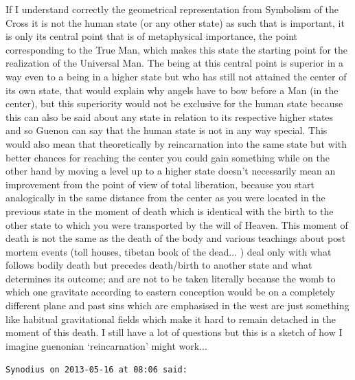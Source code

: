 \begin{footnotesize}
\begin{sffamily}
If I understand correctly the geometrical representation from Symbolism of the Cross it is not the human state (or any other state) as such that is important, it is only its central point that is of metaphysical importance, the point corresponding to the True Man, which makes this state the starting point for the realization of the Universal Man. The being at this central point is superior in a way even to a being in a higher state but who has still not attained the center of its own state, that would explain why angels have to bow before a Man (in the center), but this superiority would not be exclusive for the human state because this can also be said about any state in relation to its respective higher states and so Guenon can say that the human state is not in any way special. This would also mean that theoretically by reincarnation into the same state but with better chances for reaching the center you could gain something while on the other hand by moving a level up to a higher state doesn't necessarily mean an improvement from the point of view of total liberation, because you start analogically in the same distance from the center as you were located in the previous state in the moment of death which is identical with the birth to the other state to which you were transported by the will of Heaven. This moment of death is not the same as the death of the body and various teachings about post mortem events (toll houses, tibetan book of the dead... ) deal only with what follows bodily death but precedes death/birth to another state and what determines its outcome; and are not to be taken literally because the womb to which one gravitate according to eastern conception would be on a completely different plane and past sins which are emphasised in the west are just something like habitual gravitational fields which make it hard to remain detached in the moment of this death. I still have a lot of questions but this is a sketch of how I imagine guenonian `reincarnation' might work... 

\hfill

\texttt{Synodius on 2013-05-16 at 08:06 said:}


\end{sffamily}
\end{footnotesize}
